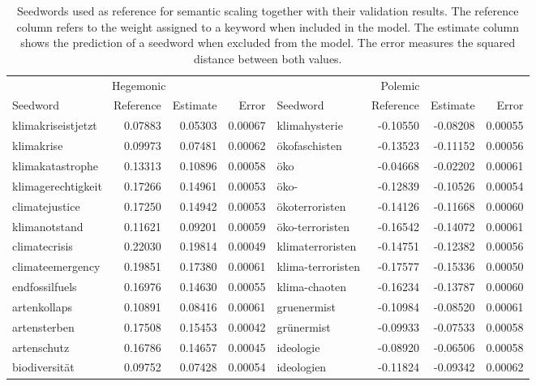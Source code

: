 \begin{table}

\caption{\label{tab:seedwords}Seedwords used as reference for semantic scaling together with their validation results. The reference column refers to the weight assigned to a keyword when included in the model. The estimate column shows the prediction of a seedword when excluded from the model. The error measures the squared distance between both values.}
\centering
\scriptsize
\begin{tabular}[t]{lrr>{}rlrrr}
\toprule
\multicolumn{4}{c}{Hegemonic} & \multicolumn{4}{c}{Polemic} \\
\cmidrule(l{3pt}r{3pt}){1-4} \cmidrule(l{3pt}r{3pt}){5-8}
Seedword & Reference & Estimate & Error & Seedword & Reference & Estimate & Error\\
\midrule
klimakriseistjetzt & 0.07883 & 0.05303 & 0.00067 & klimahysterie & -0.10550 & -0.08208 & 0.00055\\
klimakrise & 0.09973 & 0.07481 & 0.00062 & ökofaschisten & -0.13523 & -0.11152 & 0.00056\\
klimakatastrophe & 0.13313 & 0.10896 & 0.00058 & öko & -0.04668 & -0.02202 & 0.00061\\
klimagerechtigkeit & 0.17266 & 0.14961 & 0.00053 & öko- & -0.12839 & -0.10526 & 0.00054\\
climatejustice & 0.17250 & 0.14942 & 0.00053 & ökoterroristen & -0.14126 & -0.11668 & 0.00060\\
\addlinespace
klimanotstand & 0.11621 & 0.09201 & 0.00059 & öko-terroristen & -0.16542 & -0.14072 & 0.00061\\
climatecrisis & 0.22030 & 0.19814 & 0.00049 & klimaterroristen & -0.14751 & -0.12382 & 0.00056\\
climateemergency & 0.19851 & 0.17380 & 0.00061 & klima-terroristen & -0.17577 & -0.15336 & 0.00050\\
endfossilfuels & 0.16976 & 0.14630 & 0.00055 & klima-chaoten & -0.16234 & -0.13787 & 0.00060\\
artenkollaps & 0.10891 & 0.08416 & 0.00061 & gruenermist & -0.10984 & -0.08520 & 0.00061\\
\addlinespace
artensterben & 0.17508 & 0.15453 & 0.00042 & grünermist & -0.09933 & -0.07533 & 0.00058\\
artenschutz & 0.16786 & 0.14657 & 0.00045 & ideologie & -0.08920 & -0.06506 & 0.00058\\
biodiversität & 0.09752 & 0.07428 & 0.00054 & ideologien & -0.11824 & -0.09342 & 0.00062\\

\end{tabular}
\end{table}
